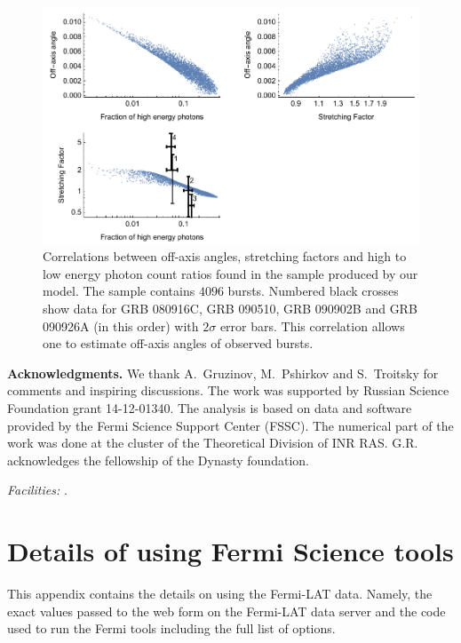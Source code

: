 \documentclass[manuscript]{aastex}
\begin{document}
\begin{figure}
        \centering
        \includegraphics[width=1.0\textwidth]{correlations}
        \caption{
        	Correlations between off-axis angles, stretching factors and high to low energy photon count ratios found in the sample produced by our model.
        	The sample contains $4096$ bursts.
        	Numbered black crosses show data for GRB 080916C, GRB 090510, GRB 090902B and GRB 090926A (in this order) with $2\sigma$ error bars.
        	This correlation allows one to estimate off-axis angles of observed bursts.
        }
        \label{fig:correlations}
\end{figure}

\acknowledgments

{\bf Acknowledgments.} We thank A.~Gruzinov, M.~Pshirkov and
S.~Troitsky for comments and inspiring discussions.  The work was
supported by Russian Science Foundation grant 14-12-01340. The
analysis is based on data and software provided by the Fermi Science
Support Center (FSSC). The numerical part of the work was done at the
cluster of the Theoretical Division of INR RAS. G.R. acknowledges the
fellowship of the Dynasty foundation.

{\it Facilities:} .

\appendix

\section{Details of using Fermi Science tools}
\label{sec:fermiCode}
This appendix contains the details on using the Fermi-LAT
data. Namely, the exact values passed to the web form on the Fermi-LAT
data server and the code used to run the Fermi tools including the
full list of options.
\end{document}
